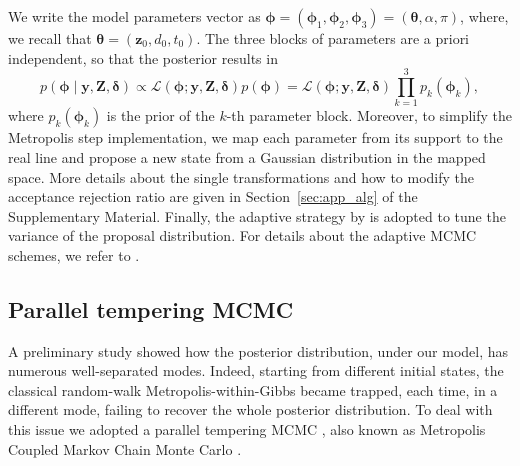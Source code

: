 \documentclass[final]{statsoc}
\newcommand{\bs}{\boldsymbol}
\begin{document}
We write the model parameters vector as $\bs{\phi} =(\bs{\phi}_{1},\bs{\phi}_{2},\bs{\phi}_{3}) = (\bs{\theta},\alpha,\pi)$, where, we recall that $\bs{\theta} =(\mathbf{z}_{0},d_{0},t_{0})$. The three blocks of parameters are a priori independent, so that the posterior results in
%
\begin{equation}
    p(\bs{\phi} \mid \mathbf{y}, \mathbf{Z}, \bs{\delta}) \propto \mathcal{L}(\bs{\phi};\mathbf{y}, \mathbf{Z}, \bs{\delta}) p(\bs{\phi}) = \mathcal{L}(\bs{\phi};\mathbf{y}, \mathbf{Z}, \bs{\delta}) \prod_{k=1}^{3} p_{k}(\bs{\phi}_{k}),
    \label{eq:posterior}
\end{equation}
%
where $p_{k}(\bs{\phi}_{k})$ is the prior of the $k$-th parameter block. Moreover, to simplify the Metropolis step implementation, we map each parameter from its support to the real line and propose a new state from a Gaussian distribution in the mapped space. More details about the single transformations and how to modify the acceptance rejection ratio are given in Section~\ref{sec:app_alg} of the Supplementary Material. Finally, the adaptive strategy by \citet{miasojedow2013adaptive} is adopted to tune the variance of the proposal distribution. For details about the adaptive MCMC schemes, we refer to \citet{andrieu2008tutorial,roberts2001optimal,atchade2005adaptive}.

\subsection{Parallel tempering MCMC}\label{sec:tempering}

A preliminary study showed how the posterior distribution, under our model, has numerous well-separated modes. Indeed, starting from different initial states, the classical random-walk Metropolis-within-Gibbs became trapped, each time, in a different mode, failing to recover the whole posterior distribution. To deal with this issue we adopted a parallel tempering MCMC \citep{woodard2009conditions}, also known as Metropolis Coupled Markov Chain Monte Carlo \citep{altekar2004parallel}.
\end{document}

